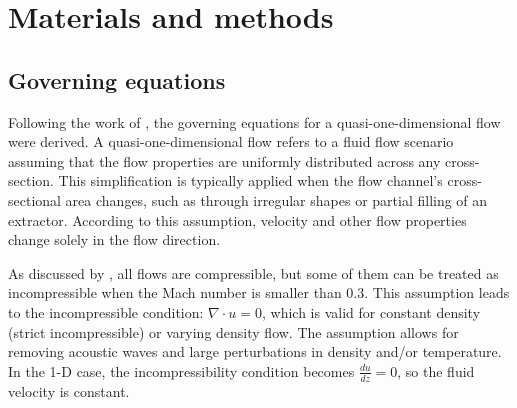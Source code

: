 \documentclass[a4paper,fleqn]{cas-dc}
\begin{document}


\section{Materials and methods} \label{CH: Materials and methods}

\subsection{Governing equations} \label{CH:Governing_equations_chapter}
Following the work of \citet{Anderson1995}, the governing equations for a quasi-one-dimensional flow were derived. A quasi-one-dimensional flow refers to a fluid flow scenario assuming that the flow properties are uniformly distributed across any cross-section. This simplification is typically applied when the flow channel's cross-sectional area changes, such as through irregular shapes or partial filling of an extractor. According to this assumption, velocity and other flow properties change solely in the flow direction.

As discussed by \citet{Anderson2023}, all flows are compressible, but some of them can be treated as incompressible when the Mach number is smaller than 0.3. This assumption leads to the incompressible condition: $\nabla \cdot u =0$, which is valid for constant density (strict incompressible) or varying density flow. The assumption allows for removing acoustic waves and large perturbations in density and/or temperature. In the 1-D case, the incompressibility condition becomes $\frac{du}{dz} = 0$, so the fluid velocity is constant.
\end{document}
